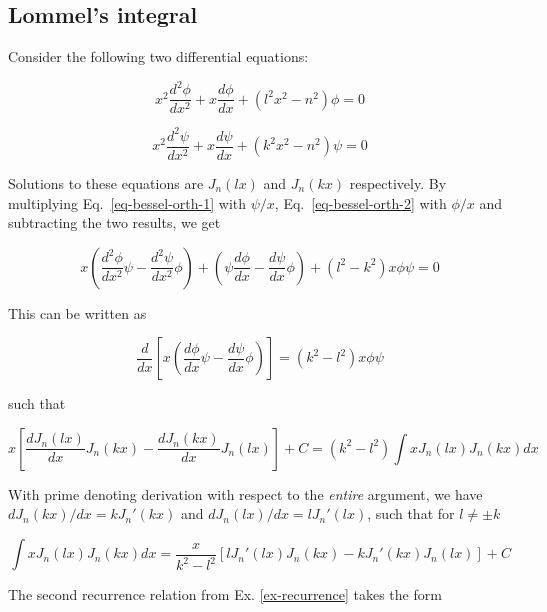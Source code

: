 \subsection*{Lommel's integral}

Consider the following two differential equations:

\begin{equation}
x^2 \frac{d^2 \phi}{dx^2}  + x \frac{d \phi}{dx} + \left(l^2x^2 - n^2\right) \phi = 0 \label{eq-bessel-orth-1}
\end{equation} 

\begin{equation}
x^2 \frac{d^2 \psi}{dx^2}  + x \frac{d \psi}{dx} + \left(k^2x^2 - n^2\right) \psi = 0 \label{eq-bessel-orth-2}
\end{equation} 

Solutions to these equations are $J_n(lx)$ and $J_n(kx)$ respectively. By multiplying Eq.~\ref{eq-bessel-orth-1} with $\psi/x$, Eq.~\ref{eq-bessel-orth-2} with $\phi/x$ and subtracting the two results, we get

\begin{equation}
x \left( \frac{d^2 \phi}{dx^2}\psi - \frac{d^2 \psi}{dx^2} \phi \right) + \left(\psi \frac{d \phi}{dx}- \frac{d \psi}{dx}\phi\right) + \left(l^2 - k^2\right) x \phi \psi = 0
\end{equation}

This can be written as

\begin{equation}
\frac{d}{dx}\left[x \left( \frac{d \phi}{dx} \psi - \frac{d \psi}{dx} \phi\right)\right] = \left(k^2 - l^2\right) x \phi \psi
\end{equation}

such that

\begin{equation}
x \left[{\frac{dJ_n(lx)}{dx}  J_n(kx) - \frac{dJ_n(kx)}{dx} J_n(lx)}\right] + C = \left(k^2 - l^2\right)\int x J_n(lx)J_n(kx)dx
\end{equation}

With prime denoting derivation with respect to the \emph{entire} argument, we have $dJ_n(kx)/dx = kJ_n'(kx)$ and $dJ_n(lx)/dx = lJ_n'(lx)$, such that for $l \ne \pm k$

\begin{equation}
\int x J_n(lx)J_n(kx)dx = \frac{x}{k^2 - l^2} \left[{l J_n'(lx) J_n(kx) -  k J_n'(kx) J_n(lx)}\right] + C \label{eq-lommel-1}
\end{equation} 

The second recurrence relation from Ex. \ref{ex-recurrence} takes the form

